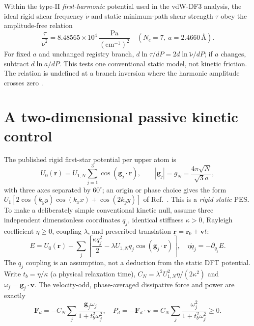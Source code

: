 \documentclass[9pt,a4paper,twocolumn]{extarticle}
\begin{document}
Within the type-II \emph{first-harmonic} potential used in the vdW-DF3 analysis, the ideal rigid shear frequency $\widetilde\nu$ and static minimum-path shear strength $\tau$ obey the amplitude-free relation
\begin{equation}
 \frac{\tau}{\widetilde\nu^2}=
 8.48565\times10^4\ \frac{\mathrm{Pa}}{(\mathrm{cm}^{-1})^2}
 \quad (N_c=7,\ a=2.4660\,\text{\AA}).\label{eq:static}
\end{equation}
For fixed $a$ and unchanged registry branch, $d\ln\tau/dP=2d\ln\widetilde\nu/dP$; if $a$ changes, subtract $d\ln a/dP$. This tests one conventional static model, not kinetic friction. The relation is undefined at a branch inversion where the harmonic amplitude crosses zero \cite{lebedeva,udrecord}.

\section{A two-dimensional passive kinetic control}
The published rigid first-star potential per upper atom is
\begin{equation}
 U_0(\mathbf r)=U_{1,N}\sum_{j=1}^{3}\cos(\mathbf g_j\cdot\mathbf r),\qquad
 |\mathbf g_j|=g_N=\frac{4\pi\sqrt N}{\sqrt3a},
 \label{eq:star}
\end{equation}
with three axes separated by $60^\circ$; an origin or phase choice gives the form $U_1[2\cos(k_yy)\cos(k_xx)+\cos(2k_yy)]$ of Ref.~\cite{lebedeva}. This is a \emph{rigid static} PES. To make a deliberately simple conventional kinetic null, assume three independent dimensionless coordinates $q_j$, identical stiffness $\kappa>0$, Rayleigh coefficient $\eta\geq0$, coupling $\lambda$, and prescribed translation $\mathbf r=\mathbf r_0+\mathbf vt$:
\begin{equation}
 E=U_0(\mathbf r)+\sum_j\left[\frac{\kappa q_j^2}{2}-\lambda U_{1,N}q_j\cos(\mathbf g_j\cdot\mathbf r)\right],\quad
 \eta\dot q_j=-\partial_{q_j}E.\label{eq:bath}
\end{equation}
The $q_j$ coupling is an assumption, not a deduction from the static DFT potential. Write $t_b=\eta/\kappa$ (a physical relaxation time), $C_N=\lambda^2U_{1,N}^2\eta/(2\kappa^2)$ and $\omega_j=\mathbf g_j\cdot\mathbf v$. The velocity-odd, phase-averaged dissipative force and power are exactly
\begin{equation}
 \mathbf F_d=-C_N\sum_j\frac{\mathbf g_j\omega_j}{1+t_b^2\omega_j^2},\quad
 P_d=-\mathbf F_d\cdot\mathbf v=C_N\sum_j\frac{\omega_j^2}{1+t_b^2\omega_j^2}\geq0.
 \label{eq:drag}
\end{equation}
\end{document}
